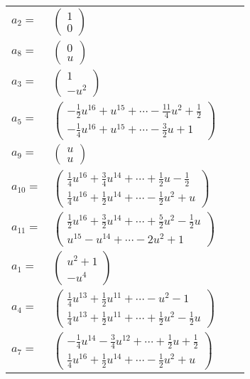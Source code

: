 \documentclass[1p]{elsarticle_modified}
\theoremstyle{definition}
\begin{document}
\begin{tabular}{m{7pt} m{180pt} m{7pt} m{180pt} }
\flushright $a_{2}=$&$\begin{pmatrix}1\\0\end{pmatrix}$ \\
\flushright $a_{8}=$&$\begin{pmatrix}0\\u\end{pmatrix}$ \\
\flushright $a_{3}=$&$\begin{pmatrix}1\\- u^2\end{pmatrix}$ \\
\flushright $a_{5}=$&$\begin{pmatrix}-\frac{1}{2} u^{16}+u^{15}+\cdots-\frac{11}{4} u^2+\frac{1}{2}\\-\frac{1}{4} u^{16}+u^{15}+\cdots-\frac{3}{2} u+1\end{pmatrix}$ \\
\flushright $a_{9}=$&$\begin{pmatrix}u\\u\end{pmatrix}$ \\
\flushright $a_{10}=$&$\begin{pmatrix}\frac{1}{4} u^{16}+\frac{3}{4} u^{14}+\cdots+\frac{1}{2} u-\frac{1}{2}\\\frac{1}{4} u^{16}+\frac{1}{2} u^{14}+\cdots-\frac{1}{2} u^2+u\end{pmatrix}$ \\
\flushright $a_{11}=$&$\begin{pmatrix}\frac{1}{2} u^{16}+\frac{3}{2} u^{14}+\cdots+\frac{5}{2} u^2-\frac{1}{2} u\\u^{15}- u^{14}+\cdots-2 u^2+1\end{pmatrix}$ \\
\flushright $a_{1}=$&$\begin{pmatrix}u^2+1\\- u^4\end{pmatrix}$ \\
\flushright $a_{4}=$&$\begin{pmatrix}\frac{1}{4} u^{13}+\frac{1}{2} u^{11}+\cdots- u^2-1\\\frac{1}{4} u^{13}+\frac{1}{2} u^{11}+\cdots+\frac{1}{2} u^2-\frac{1}{2} u\end{pmatrix}$ \\
\flushright $a_{7}=$&$\begin{pmatrix}-\frac{1}{4} u^{14}-\frac{3}{4} u^{12}+\cdots+\frac{1}{2} u+\frac{1}{2}\\\frac{1}{4} u^{16}+\frac{1}{2} u^{14}+\cdots-\frac{1}{2} u^2+u\end{pmatrix}$ \\

\end{tabular}
\end{document}
